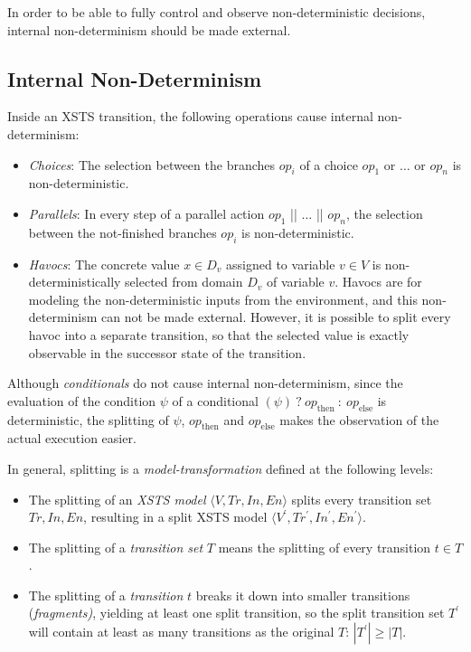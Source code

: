 In order to be able to fully control and observe non-deterministic decisions, internal non-determinism should be made external.

\subsection{Internal Non-Determinism}
Inside an XSTS transition, the following operations cause internal non-determinism:

\begin{itemize}
    \item \textit{Choices}: The selection between the branches $op_i$ of a choice $op_1$ or $\ldots$ or $op_n$ is non-deterministic.
    \item \textit{Parallels}: In every step of a parallel action $op_1$ || $\ldots$ || $op_n$, the selection between the not-finished branches $op_i$ is non-deterministic.
    \item \textit{Havocs}: The concrete value $x \in D_v$ assigned to variable $v \in V$ is non-deterministically selected from domain $D_v$ of variable $v$. Havocs are for modeling the non-deterministic inputs from the environment, and this non-determinism can not be made external. However, it is possible to split every havoc into a separate transition, so that the selected value is exactly observable in the successor state of the transition.
\end{itemize}

Although \textit{conditionals} do not cause internal non-determinism, since the evaluation of the condition $\psi$ of a conditional $(\psi)\ ?\ op_{\mathrm{then}}\ :\ op_{\mathrm{else}}$ is deterministic, the splitting of $\psi$, $op_{\mathrm{then}}$ and $op_{\mathrm{else}}$ makes the observation of the actual execution easier.

In general, splitting is a \textit{model-transformation} defined at the following levels:
\begin{itemize}
    \item The splitting of an \textit{XSTS model} $\langle V, Tr, In, En \rangle$ splits every transition set $Tr, In, En$, resulting in a split XSTS model $\langle V^\prime, Tr^\prime, In^\prime, En^\prime \rangle$.
    \item The splitting of a \textit{transition set} $T$ means the splitting of every transition $t \in T$.
    \item The splitting of a \textit{transition} $t$ breaks it down into smaller transitions (\textit{fragments)}, yielding at least one split transition, so the split transition set $T^\prime$ will contain at least as many transitions as the original $T$: $|T^\prime| \geq |T|$.
\end{itemize}

